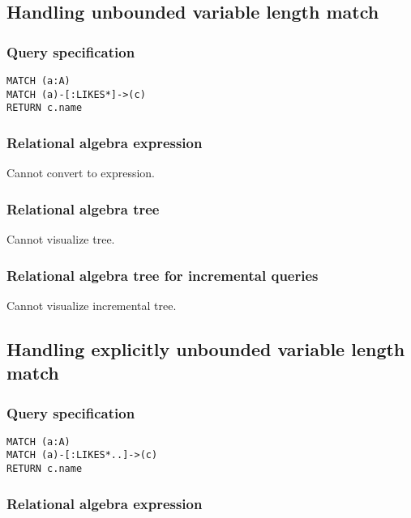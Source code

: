 \subsection{Handling unbounded variable length match}

\subsubsection*{Query specification}

\begin{lstlisting}
MATCH (a:A)
MATCH (a)-[:LIKES*]->(c)
RETURN c.name
\end{lstlisting}

\subsubsection*{Relational algebra expression}

Cannot convert to expression.

\subsubsection*{Relational algebra tree}

Cannot visualize tree.

\subsubsection*{Relational algebra tree for incremental queries}

Cannot visualize incremental tree.

\subsection{Handling explicitly unbounded variable length match}

\subsubsection*{Query specification}

\begin{lstlisting}
MATCH (a:A)
MATCH (a)-[:LIKES*..]->(c)
RETURN c.name
\end{lstlisting}

\subsubsection*{Relational algebra expression}

